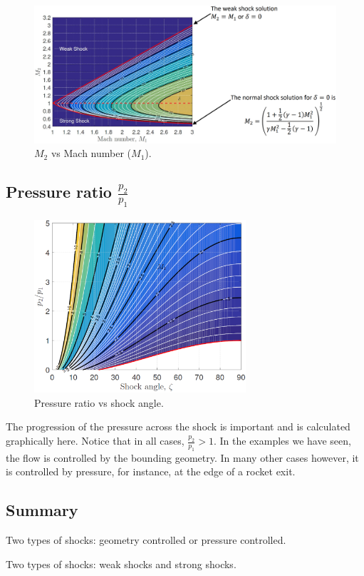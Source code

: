 \documentclass[class=report, crop=false, 12pt,a4paper]{standalone}
\begin{document}
\begin{figure}[H]
    \centering
    \includegraphics[width = \textwidth]{../img/hd/diagram7.png}
    \caption{$M_2$ vs Mach number ($M_1$).}
\end{figure}
\subsection{Pressure ratio $\frac{p_2}{p_1}$}
\begin{figure}[H]
    \centering
    \includegraphics[width = 0.7\textwidth]{../img/hd/diagram8.png}
    \caption{Pressure ratio vs shock angle.}
\end{figure}
The progression of the pressure across the shock is important and is calculated graphically here. Notice that in all cases, $\frac{p_2}{p_1}>1$. In the examples we have seen, the flow is controlled by the bounding geometry. In many other cases however, it is controlled by pressure, for instance, at the edge of a rocket exit.
\subsection{Summary}
Two types of shocks: geometry controlled or pressure controlled.

Two types of shocks: weak shocks and strong shocks.
\end{document}
